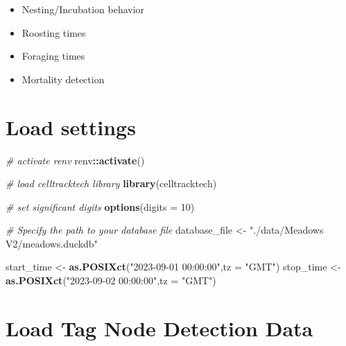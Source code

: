 \documentclass[
]{book}
\newenvironment{Shaded}{\begin{snugshade}}{\end{snugshade}}
\newcommand{\AttributeTok}[1]{\textcolor[rgb]{0.13,0.29,0.53}{#1}}
\newcommand{\CommentTok}[1]{\textcolor[rgb]{0.56,0.35,0.01}{\textit{#1}}}
\newcommand{\DecValTok}[1]{\textcolor[rgb]{0.00,0.00,0.81}{#1}}
\newcommand{\FunctionTok}[1]{\textcolor[rgb]{0.13,0.29,0.53}{\textbf{#1}}}
\newcommand{\NormalTok}[1]{#1}
\newcommand{\OtherTok}[1]{\textcolor[rgb]{0.56,0.35,0.01}{#1}}
\newcommand{\SpecialCharTok}[1]{\textcolor[rgb]{0.81,0.36,0.00}{\textbf{#1}}}
\newcommand{\StringTok}[1]{\textcolor[rgb]{0.31,0.60,0.02}{#1}}
\providecommand{\tightlist}{%
  \setlength{\itemsep}{0pt}\setlength{\parskip}{0pt}}
\begin{document}
\begin{itemize}
\tightlist
\item
  Nesting/Incubation behavior
\item
  Roosting times
\item
  Foraging times
\item
  Mortality detection
\end{itemize}

\section{Load settings}\label{load-settings-1}

\begin{Shaded}
\begin{Highlighting}[]
\CommentTok{\# activate renv}
\NormalTok{renv}\SpecialCharTok{::}\FunctionTok{activate}\NormalTok{()}
\end{Highlighting}
\end{Shaded}

\begin{Shaded}
\begin{Highlighting}[]
\CommentTok{\# load celltracktech library}
\FunctionTok{library}\NormalTok{(celltracktech)}

\CommentTok{\# set significant digits}
\FunctionTok{options}\NormalTok{(}\AttributeTok{digits =} \DecValTok{10}\NormalTok{)}

\CommentTok{\# Specify the path to your database file}
\NormalTok{database\_file }\OtherTok{\textless{}{-}} \StringTok{"./data/Meadows V2/meadows.duckdb"}

\NormalTok{start\_time }\OtherTok{\textless{}{-}} \FunctionTok{as.POSIXct}\NormalTok{(}\StringTok{"2023{-}09{-}01 00:00:00"}\NormalTok{,}\AttributeTok{tz =} \StringTok{"GMT"}\NormalTok{)}
\NormalTok{stop\_time }\OtherTok{\textless{}{-}} \FunctionTok{as.POSIXct}\NormalTok{(}\StringTok{"2023{-}09{-}02 00:00:00"}\NormalTok{,}\AttributeTok{tz =} \StringTok{"GMT"}\NormalTok{)}
\end{Highlighting}
\end{Shaded}

\section{Load Tag Node Detection Data}\label{load-tag-node-detection-data}
\end{document}
